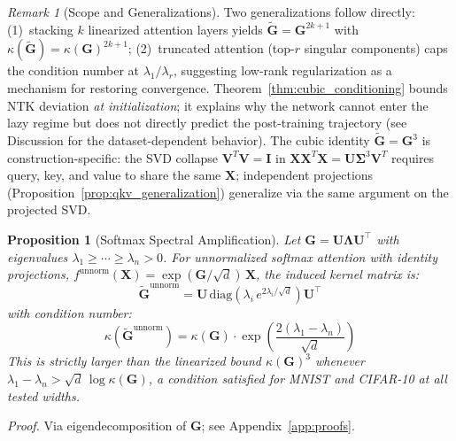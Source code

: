 \documentclass{article}
\theoremstyle{plain}
\newtheorem{proposition}[theorem]{Proposition}
\theoremstyle{definition}
\theoremstyle{remark}
\newtheorem{remark}[theorem]{Remark}
\begin{document}
\begin{remark}[Scope and Generalizations]
\label{rmk:spectral_scope}
Two generalizations follow directly: (1)~stacking $k$ linearized attention layers yields $\tilde{\mathbf{G}} = \mathbf{G}^{2k+1}$ with $\kappa(\tilde{\mathbf{G}}) = \kappa(\mathbf{G})^{2k+1}$; (2)~truncated attention (top-$r$ singular components) caps the condition number at $\lambda_1/\lambda_r$, suggesting low-rank regularization as a mechanism for restoring convergence. Theorem~\ref{thm:cubic_conditioning} bounds NTK deviation \emph{at initialization}; it explains why the network cannot enter the lazy regime but does not directly predict the post-training trajectory (see Discussion for the dataset-dependent behavior). The cubic identity $\tilde{\mathbf{G}}=\mathbf{G}^3$ is construction-specific: the SVD collapse $\mathbf{V}^T\mathbf{V}=\mathbf{I}$ in $\mathbf{X}\mathbf{X}^T\mathbf{X}=\mathbf{U}\boldsymbol{\Sigma}^3\mathbf{V}^T$ requires query, key, and value to share the same $\mathbf{X}$; independent projections (Proposition~\ref{prop:qkv_generalization}) generalize via the same argument on the projected SVD.
\end{remark}

\begin{proposition}[Softmax Spectral Amplification]
\label{prop:softmax_amplification}
Let $\mathbf{G} = \mathbf{U}\boldsymbol{\Lambda}\mathbf{U}^\top$ with eigenvalues $\lambda_1 \geq \cdots \geq \lambda_n > 0$. For unnormalized softmax attention with identity projections, $f^{\mathrm{unnorm}}(\mathbf{X}) = \exp(\mathbf{G}/\sqrt{d})\,\mathbf{X}$, the induced kernel matrix is:
\begin{equation}
\tilde{\mathbf{G}}^{\mathrm{unnorm}} = \mathbf{U}\,\mathrm{diag}\!\left(\lambda_i\,e^{2\lambda_i/\sqrt{d}}\right)\mathbf{U}^\top
\end{equation}
with condition number:
\begin{equation}
\kappa\!\left(\tilde{\mathbf{G}}^{\mathrm{unnorm}}\right) = \kappa(\mathbf{G})\cdot\exp\!\left(\frac{2(\lambda_1-\lambda_n)}{\sqrt{d}}\right)
\end{equation}
This is strictly larger than the linearized bound $\kappa(\mathbf{G})^3$ whenever $\lambda_1 - \lambda_n > \sqrt{d}\,\log\kappa(\mathbf{G})$, a condition satisfied for MNIST and CIFAR-10 at all tested widths.
\end{proposition}

\emph{Proof.} Via eigendecomposition of $\mathbf{G}$; see Appendix~\ref{app:proofs}.
\end{document}
